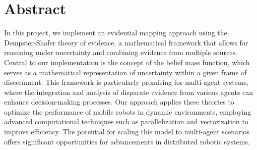 \chapter{Abstract}

In this project, we implement an evidential mapping approach using the Dempster-Shafer theory of evidence, a mathematical framework that allows for reasoning under uncertainty and combining evidence from multiple sources. Central to our implementation is the concept of the belief mass function, which serves as a mathematical representation of uncertainty within a given frame of discernment. This framework is particularly promising for multi-agent systems, where the integration and analysis of disparate evidence from various agents can enhance decision-making processes. Our approach applies these theories to optimize the performance of mobile robots in dynamic environments, employing advanced computational techniques such as parallelization and vectorization to improve efficiency. The potential for scaling this model to multi-agent scenarios offers significant opportunities for advancements in distributed robotic systems.
